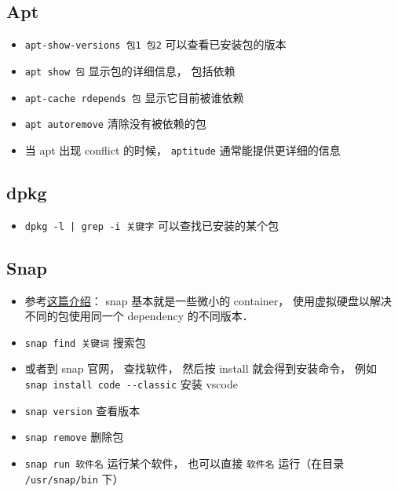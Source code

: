 
\begin{issues}
\issueDraft
\end{issues}

\subsection{Apt}
\begin{itemize}
\item \verb|apt-show-versions 包1 包2| 可以查看已安装包的版本
\item \verb|apt show 包| 显示包的详细信息， 包括依赖
\item \verb|apt-cache rdepends 包| 显示它目前被谁依赖
\item \verb|apt autoremove| 清除没有被依赖的包
\item 当 apt 出现 conflict 的时候， \verb|aptitude| 通常能提供更详细的信息
\end{itemize}

\subsection{dpkg}
\begin{itemize}
\item \verb`dpkg -l | grep -i 关键字` 可以查找已安装的某个包
\end{itemize}

\subsection{Snap}
\begin{itemize}
\item 参考\href{https://www.howtogeek.com/660193/how-to-work-with-snap-packages-on-linux/}{这篇介绍}： snap 基本就是一些微小的 container， 使用虚拟硬盘以解决不同的包使用同一个 dependency 的不同版本．
\item \verb|snap find 关键词| 搜索包
\item 或者到 snap 官网， 查找软件， 然后按 install 就会得到安装命令， 例如 \verb|snap install code --classic| 安装 vscode
\item \verb|snap version| 查看版本
\item \verb|snap remove| 删除包
\item \verb|snap run 软件名| 运行某个软件， 也可以直接 \verb|软件名| 运行（在目录 \verb|/usr/snap/bin| 下）
\end{itemize}
